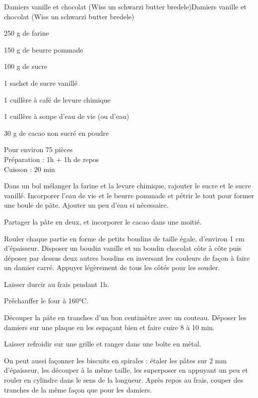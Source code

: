 \begin{recette}{Damiers vanille et chocolat (Wiss un schwarzi butter bredele)}{Damiers vanille et chocolat (Wiss un schwarzi butter bredele)}

\begin{ingredients}
250 g de farine\par
150 g de beurre pommade\par
100 g de sucre\par
1 sachet de sucre vanillé\par
1 cuillère à café de levure chimique\par
1 cuillère à soupe d'eau de vie (ou d'eau)\par
30 g de cacao non sucré en poudre\par
\end{ingredients}

\begin{infos}
Pour environ 75 pièces		\\
Préparation : 1h + 1h de repos	\\
Cuisson : 20 min		\\
\end{infos}

\begin{etapes}
\item Dans un bol mélanger la farine et la levure chimique, rajouter le sucre et le sucre vanillé. Incorporer l’eau de vie et le beurre pommade et pétrir le tout pour former une boule de pâte. Ajouter un peu d'eau si nécessaire.
\item Partager la pâte en deux, et incorporer le cacao dans une moitié.
\item Rouler chaque partie en forme de petits boudins de taille égale, d'environ 1 cm d'épaisseur. Disposer un boudin vanille et un boudin chocolat côte à côte puis déposer par dessus deux autres boudins en inversant les couleurs de façon à faire un damier carré. Appuyer légèrement de tous les côtés pour les souder.
\item Laisser durcir au frais pendant 1h.
\item Préchauffer le four à 160°C.
\item Découper la pâte en tranches d'un bon centimètre avec un couteau. Déposer les damiers sur une plaque en les espaçant bien et faire cuire 8 à 10 min.
\item Laisser refroidir sur une grille et ranger dans une boîte en métal.
\end{etapes}

\begin{conseils}
On peut aussi façonner les biscuits en spirales : étaler les pâtes sur 2 mm d'épaisseur, les découper à la même taille, les superposer en appuyant un peu et rouler en cylindre dans le sens de la longueur. Après repos au frais, couper des tranches de la même façon que pour les damiers.
\end{conseils}

\end{recette}